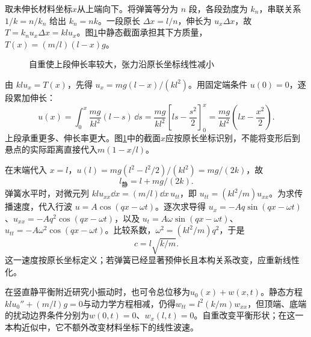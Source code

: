 \begin{solution}
取未伸长材料坐标$x$从上端向下。将弹簧等分为 $n$ 段，各段劲度为 $k_n$，串联关系 $1/k=n/k_n$ 给出 $k_n=nk$。一段原长 $\Delta x=l/n$，伸长为 $u_x\Delta x$，故 $T=k_nu_x\Delta x=klu_x$。图\ref{fig:hw7-3-s}中静态截面承担其下方质量，$T(x)=(m/l)(l-x)g$。

\begin{figure}[H]\centering
{}
\caption{自重使上段伸长率较大，张力沿原长坐标线性减小}\label{fig:hw7-3-s}
\end{figure}

由 $klu_x=T(x)$，先得 $u_x=mg(l-x)/(kl^2)$。用固定端条件 $u(0)=0$，逐段累加伸长：
\[
 u(x)=\int_0^x\frac{mg}{kl^2}(l-s)\,\dd s
 =\frac{mg}{kl^2}\left[ls-\frac{s^2}{2}\right]_0^x
 =\frac{mg}{kl^2}\left(lx-\frac{x^2}{2}\right).
\]
上段承重更多、伸长率更大。图\ref{fig:hw7-3-s}中的截面$x$应按原长坐标识别，不能将变形后到悬点的实际距离直接代入$m(1-x/l)$。

在末端代入 $x=l$，$u(l)=mg(l^2-l^2/2)/(kl^2)=mg/(2k)$，故
\[
 \boxed{l_{\text{静}}=l+mg/(2k)}.
\]
弹簧水平时，对微元列 $kl u_{xx}\dd x=(m/l)\dd x\,u_{tt}$，即 $u_{tt}=(kl^2/m)u_{xx}$。为求传播速度，代入行波 $u=A\cos(qx-\omega t)$。逐次求导得 $u_x=-Aq\sin(qx-\omega t)$、$u_{xx}=-Aq^2\cos(qx-\omega t)$，以及 $u_t=A\omega\sin(qx-\omega t)$、$u_{tt}=-A\omega^2\cos(qx-\omega t)$。比较系数，$\omega^2=(kl^2/m)q^2$，于是
\[
 \boxed{c=l\sqrt{k/m}}.
\]
这一速度按原长坐标定义；若弹簧已经显著预伸长且本构关系改变，应重新线性化。

在竖直静平衡附近研究小振动时，也可令总位移为$u_0(x)+w(x,t)$。静态方程$klu_0''+(m/l)g=0$与动力学方程相减，仍得$w_{tt}=l^2(k/m)w_{xx}$，但顶端、底端的扰动边界条件分别为$w(0,t)=0$、$w_x(l,t)=0$。自重改变平衡形状；在这一本构近似中，它不额外改变材料坐标下的线性波速。

\end{solution}



